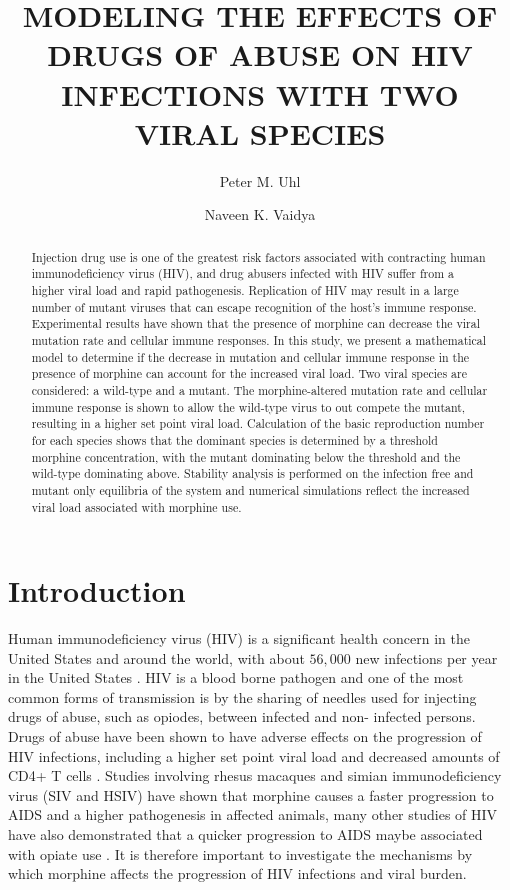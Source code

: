 \documentclass[11pt, oneside]{article}    %
\title{  MODELING THE EFFECTS OF DRUGS OF ABUSE ON HIV INFECTIONS WITH TWO VIRAL SPECIES}
\author[1]{Peter M. Uhl}
\author[1,2]{Naveen K. Vaidya}
\affil[1]{Computational Science Research Center, San Diego State University}
\affil[2]{Department of Mathematics and Statistics, San Diego State University}
\begin{document}
\maketitle

\begin{abstract}

Injection drug use is one of the greatest risk factors associated with contracting human immunodeficiency virus (HIV), and drug abusers infected with HIV suffer from a higher viral load and rapid pathogenesis. Replication of HIV may result in a large number of mutant viruses that can escape recognition of the host’s immune response. Experimental results have shown that the presence of morphine can decrease the viral mutation rate and cellular immune responses. In this study, we present a mathematical model to determine if the decrease in mutation and cellular immune response in the presence of morphine can account for the increased viral load. Two viral species are considered: a wild-type and a mutant. The morphine-altered mutation rate and cellular immune response is shown to allow the wild-type virus to out compete the mutant, resulting in a higher set point viral load. Calculation of the basic reproduction number for each species shows that the dominant species is determined by a threshold morphine concentration, with the mutant dominating below the threshold and the wild-type dominating above. Stability analysis is performed on the infection free and mutant only equilibria of the system and numerical simulations reflect the increased viral load associated with morphine use.

\end{abstract}

\section{Introduction}

	Human immunodeficiency virus (HIV) is a significant health concern in the United States and around the world, with about $56,000$ new infections per year in the United States \cite{MMWR}. HIV is a blood borne pathogen and one of the most common forms of transmission is by the sharing of needles used for injecting drugs of abuse, such as opiodes, between infected and non- infected persons. Drugs of abuse have been shown to have adverse effects on the progression of HIV infections, including a higher set point viral load and decreased amounts of CD4+ T cells \cite{Kumar}. Studies involving rhesus macaques and simian immunodeficiency virus (SIV and HSIV) have shown that morphine causes a faster progression to AIDS and a higher pathogenesis in affected animals, many other studies of HIV have also demonstrated that a quicker progression to AIDS maybe associated with opiate use \cite{Hauser}. It is therefore important to investigate the mechanisms by which morphine affects the progression of HIV infections and viral burden.
\end{document}
